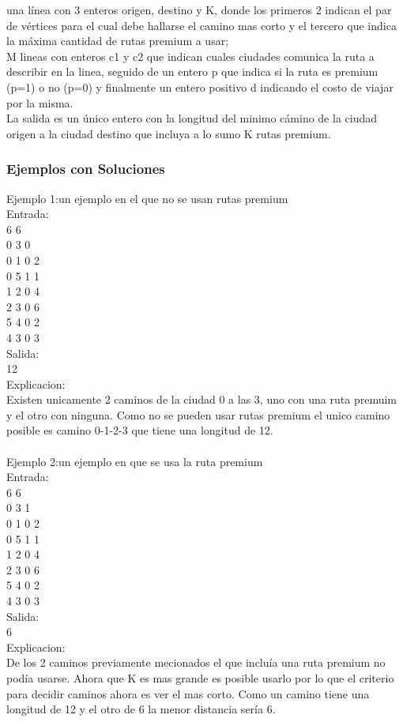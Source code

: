 una línea con 3 enteros origen, destino y K, donde los primeros 2 indican el par de vértices para el cual debe hallarse el camino mas corto y el tercero que indica la máxima cantidad de rutas premium a usar;\\
M lineas con enteros c1 y c2 que indican cuales ciudades comunica la ruta a describir en la linea, seguido de un entero p que indica si la ruta es premium (p=1) o no (p=0) y finalmente un entero positivo d indicando el costo de viajar por la misma.
\\
La salida es un único entero con la longitud del minimo cámino de la ciudad origen a la ciudad destino que incluya a lo sumo K rutas premium.\\


\subsubsection{Ejemplos con Soluciones}
Ejemplo 1:un ejemplo en el que no se usan rutas premium\\
Entrada:\\
6 6\\
0 3 0\\
0 1 0 2\\
0 5 1 1\\
1 2 0 4\\
2 3 0 6\\
5 4 0 2\\
4 3 0 3\\
Salida:\\
12\\
Explicacion:\\
Existen unicamente 2 caminos de la ciudad 0 a las 3, uno con una ruta premuim y el otro con ninguna. Como no se pueden usar rutas premium el unico camino posible es camino 0-1-2-3 que tiene una longitud de 12.\\
\\
Ejemplo 2:un ejemplo en que se usa la ruta premium\\
Entrada:\\
6 6\\
0 3 1\\
0 1 0 2\\
0 5 1 1\\
1 2 0 4\\
2 3 0 6\\
5 4 0 2\\
4 3 0 3\\
Salida:\\
6\\
Explicacion:\\
De los 2 caminos previamente mecionados el que incluía una ruta premium no podía usarse. Ahora que K es mas grande es posible usarlo por lo que el criterio para decidir caminos ahora es ver el mas corto. Como un camino tiene una longitud de 12 y el otro de 6 la menor distancia sería 6.




